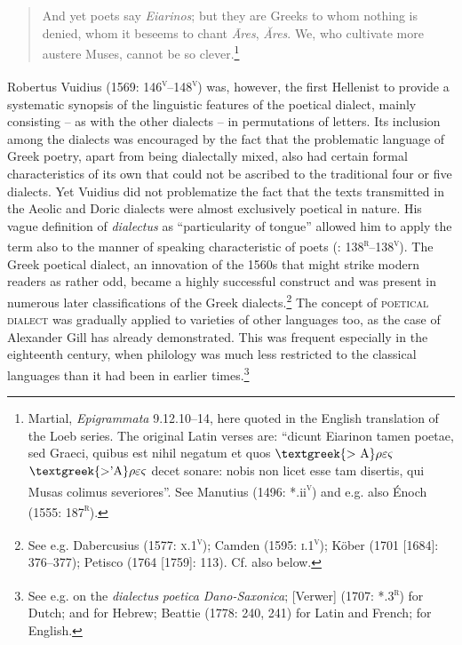 \documentclass[output=paper]{langsci/langscibook}
\begin{document}
\begin{quote}
And yet poets say \textit{Eiarinos}; {\textbar} but they are Greeks to whom nothing is denied, {\textbar} whom it beseems to chant \textit{Āres}, \textit{Ăres}. {\textbar} We, who cultivate more austere Muses, {\textbar} cannot be so clever.\footnote{Martial, \textit{Epigrammata} 9.12.10–14, here quoted in the English translation of the Loeb series. The original Latin verses are: “dicunt Eiarinon tamen poetae, {\textbar} sed Graeci, quibus est nihil negatum {\textbar} et quos $\text{\textgreek{>~A}}\rho \varepsilon \varsigma $ $\text{\textgreek{>'A}}\rho \varepsilon \varsigma $ decet sonare: {\textbar} nobis non licet esse tam disertis, {\textbar} qui Musas colimus severiores”. See Manutius (1496: *.ii\textsc{\textsuperscript{v}}) and e.g. also Énoch (1555: 187\textsc{\textsuperscript{r}}).}
\end{quote}

Robertus Vuidius (1569: 146\textsc{\textsuperscript{v}}–148\textsc{\textsuperscript{v}}) was, however, the first Hellenist to provide a systematic synopsis of the linguistic features of the poetical dialect, mainly consisting – as with the other dialects – in permutations of letters. Its inclusion among the dialects was encouraged by the fact that the problematic language of Greek poetry, apart from being dialectally mixed, also had certain formal characteristics of its own that could not be ascribed to the traditional four or five dialects. Yet Vuidius did not problematize the fact that the texts transmitted in the Aeolic and Doric dialects were almost exclusively poetical in nature. His vague definition of \textit{dialectus} as “particularity of tongue” allowed him to apply the term also to the manner of speaking characteristic of poets (\citealt{Vuidius1569}: 138\textsc{\textsuperscript{r}}–138\textsc{\textsuperscript{v}}). The Greek poetical dialect, an innovation of the 1560s that might strike modern readers as rather odd, became a highly successful construct and was present in numerous later classifications of the Greek dialects.\footnote{See e.g. Dabercusius (1577: \textsc{x}.1\textsc{\textsuperscript{v}}); Camden (1595: \textsc{i.1}\textsc{\textsuperscript{v}}); Köber (1701 [1684]: 376–377); Petisco (1764 [1759]: 113). Cf. also  below.} The concept of \textsc{poetical} \textsc{dialect} was gradually applied to varieties of other languages too, as the case of Alexander Gill has already demonstrated. This was frequent especially in the eighteenth century, when philology was much less restricted to the classical languages than it had been in earlier times.\footnote{See e.g. \citet[101]{Hickes1705} on the \textit{dialectus} \textit{poetica} \textit{Dano-Saxonica}; [Verwer] (1707: *.3\textsc{\textsuperscript{r}}) for Dutch; \citet[24]{Wesley1736} and \citet{Vogel1764} for Hebrew; Beattie (1778: 240, 241) for Latin and French; \citet[292]{MacNicol1779} for English.}
\end{document}
